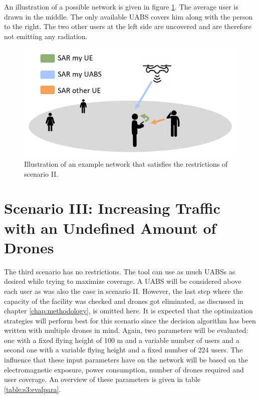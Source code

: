 An illustration of a possible network is given in figure \ref{fig:IllustrationS2}. The average user is drawn in the middle. The only available \gls{UABS} covers him along with the person to the right.
The two other  users at the left side are uncovered and are therefore not  emitting any radiation.
\begin{figure}[H]
\centering
  \includegraphics[width=\textwidth/5*3]{../images/IllustrationS2.png}
  \caption{Illustration of an example network that satisfies the restrictions of scenario II.}
  \label{fig:IllustrationS2}
\end{figure}


\section{Scenario III: Increasing Traffic with an Undefined Amount of Drones}


The third scenario has no restrictions. The tool can use as much \gls{UABS}s as desired while trying to maximize coverage. 
A \gls{UABS} will be considered above each user as was also the case in scenario II. However, the last step where the capacity of the facility
was checked and drones got eliminated, as discussed in chapter \ref{chap:methodology}, is omitted here. It is expected that the optimization strategies will perform best for this scenario since the decision algorithm has been written
 with multiple drones in mind.
Again, two parameters will be evaluated: one with a fixed flying height of 100 m and a variable number of users and a second one with 
a variable flying height and a fixed number of 224 users.
The influence that these input parameters have on the network will be based on the electromagnetic exposure, power consumption, number of drones required and user coverage.
An overview of these parameters is given in table \ref{table:s3:evalpara}.

